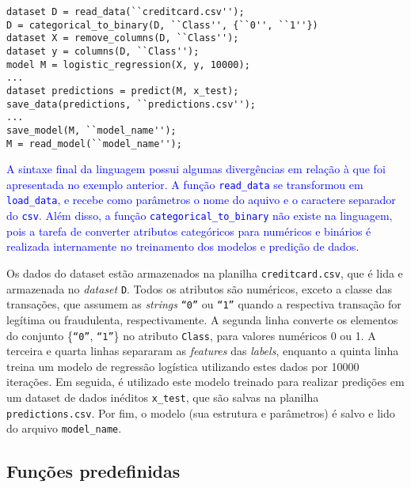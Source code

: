 \documentclass[12pt]{article}
\newcommand{\blu}{\textcolor{blue}}
\begin{document}
\begin{verbatim}
dataset D = read_data(``creditcard.csv'');
D = categorical_to_binary(D, ``Class'', {``0'', ``1''})
dataset X = remove_columns(D, ``Class'');
dataset y = columns(D, ``Class'');
model M = logistic_regression(X, y, 10000);
...
dataset predictions = predict(M, x_test);
save_data(predictions, ``predictions.csv'');
...
save_model(M, ``model_name'');
M = read_model(``model_name'');
\end{verbatim}

\blu{A sintaxe final da linguagem possui algumas divergências em relação à que foi apresentada no exemplo anterior. A função \texttt{read\_data} se transformou em \texttt{load\_data}, e recebe como parâmetros o nome do aquivo e o caractere separador do \texttt{csv}. Além disso, a função \texttt{categorical\_to\_binary} não existe na linguagem, pois a tarefa de converter atributos categóricos para numéricos e binários é realizada internamente no treinamento dos modelos e predição de dados}.

Os dados do dataset estão armazenados na planilha {\tt creditcard.csv}, que é lida e armazenada no {\it dataset} {\tt D}. Todos os atributos são numéricos, exceto a classe das transações, que assumem as {\it strings} {\tt ``0''} ou {\tt ``1''} quando a respectiva transação for legítima ou fraudulenta, respectivamente. A segunda linha converte os elementos do conjunto \{{\tt ``0''}, {\tt ``1''}\} no atributo {\tt Class}, para valores numéricos 0 ou 1. A terceira e quarta linhas separaram as {\it features} das {\it labels}, enquanto a quinta linha treina um modelo de regressão logística utilizando estes dados por 10000 iterações. Em seguida, é utilizado este modelo treinado para realizar predições em um dataset de dados inéditos {\tt x\_test}, que são salvas na planilha {\tt predictions.csv}. Por fim, o modelo (sua estrutura e parâmetros) é salvo e lido do arquivo {\tt model\_name}.

\subsection{Funções predefinidas}
\end{document}
